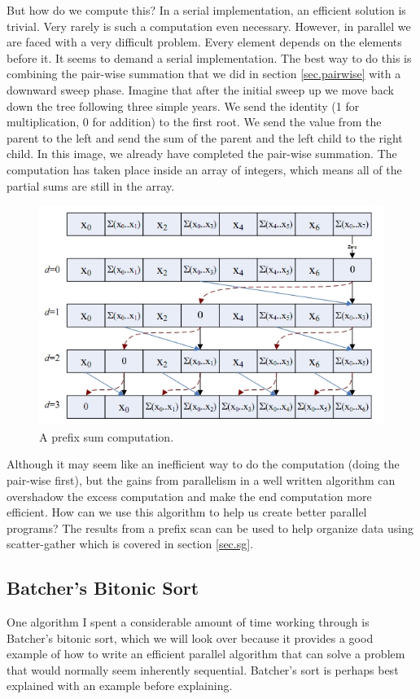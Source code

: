 \documentclass{article}
\begin{document}
    But how do we compute this? In a serial implementation, an efficient solution is trivial. Very rarely is such a computation even necessary. However, in parallel we are faced with a very difficult problem. Every element depends on the elements before it. It seems to demand a serial implementation. The best way to do this is combining the pair-wise summation that we did in section \ref{sec.pairwise} with a downward sweep phase. Imagine that after the initial sweep up we move back down the tree following three simple years. We send the identity (1 for multiplication, 0 for addition) to the first root. We send the value from the parent to the left and send the sum of the parent and the left child to the right child. In this image, we already have completed the pair-wise summation. The computation has taken place inside an array of integers, which means all of the partial sums are still in the array.

	\begin{figure}
    \centering
    \includegraphics[scale=.65]{pic/PrefixSum.jpg}
    \caption{A prefix sum computation.}
    \end{figure}


    Although it may seem like an inefficient way to do the computation (doing the pair-wise first), but the gains from parallelism in a well written algorithm can overshadow the excess computation and make the end computation more efficient. How can we use this algorithm to help us create better parallel programs? The results from a prefix scan can be used to help organize data using scatter-gather which is covered in section \ref{sec.sg}.





    \subsection{Batcher's Bitonic Sort}
      One algorithm I spent a considerable amount of time working through is Batcher's bitonic sort, which we will look over because it provides a good example of how to write an efficient parallel algorithm that can solve a problem that would normally seem inherently sequential. Batcher's sort is perhaps best explained with an example before explaining. 
      
\end{document}
